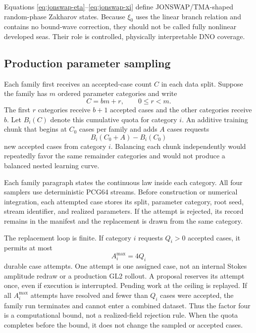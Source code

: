 \documentclass[11pt]{article}
\begin{document}
Equations \eqref{eq:jonswap-eta}--\eqref{eq:jonswap-xi} define
JONSWAP/TMA-shaped random-phase Zakharov states.  Because $\xi_0$ uses the
linear branch relation and contains no bound-wave correction, they should not
be called fully nonlinear developed seas.  Their role is controlled,
physically interpretable DNO coverage.

\subsection{Production parameter sampling}

Each family first receives an accepted-case count $C$ in each data split.
Suppose the family has $m$ ordered parameter categories and write
\begin{equation}
  C=bm+r,\qquad 0\leq r<m.
\end{equation}
The first $r$ categories receive $b+1$ accepted cases and the other
categories receive $b$.  Let $B_i(C)$ denote this cumulative quota for
category $i$.  An additive
training chunk that begins at $C_0$ cases per family and adds $A$ cases
requests
\begin{equation}
  B_i(C_0+A)-B_i(C_0)
  \label{eq:additive-cell-quota}
\end{equation}
new accepted cases from category $i$.  Balancing each chunk independently would
repeatedly favor the same remainder categories and would not produce a balanced
nested learning curve.

Each family paragraph states the continuous law inside each category.  All four
samplers use deterministic PCG64 streams.  Before construction or numerical
integration, each attempted case stores its split, parameter category, root seed, stream
identifier, and realized parameters.  If the attempt is rejected, its record
remains in the manifest and the replacement is drawn from the same category.

The replacement loop is finite.  If category $i$ requests $Q_i>0$ accepted cases,
it permits at most
\begin{equation}
  A_i^{\max}=4Q_i
  \label{eq:cell-attempt-ceiling}
\end{equation}
durable case attempts.  One attempt is one assigned case, not an internal
Stokes amplitude redraw or a production GL2 rollout.  A proposal reserves
its attempt once, even if execution is interrupted.  Pending work at the
ceiling is replayed.  If all $A_i^{\max}$ attempts have resolved and fewer
than $Q_i$ cases were accepted, the family run terminates and cannot enter a
combined dataset.  Thus the factor four is a computational bound, not a
realized-field rejection rule.  When the quota completes before the bound, it
does not change the sampled or accepted cases.
\end{document}
